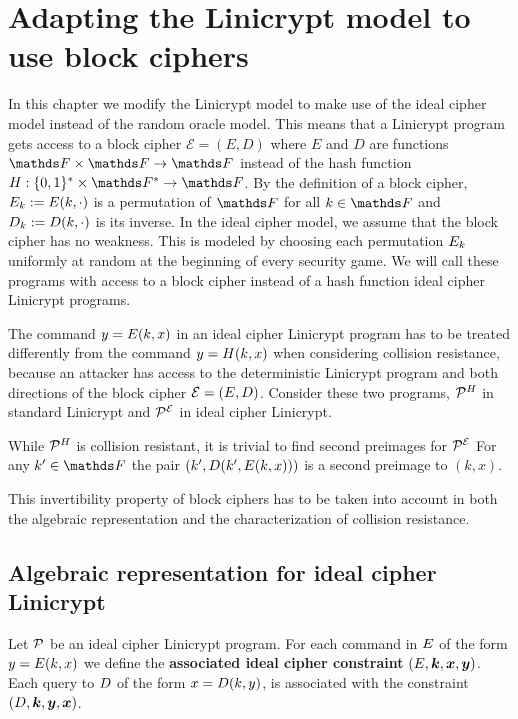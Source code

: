\section{Adapting the Linicrypt model to use block ciphers}

In this chapter we modify the Linicrypt model to make use of the ideal cipher model instead of the random oracle model.
This means that a Linicrypt program gets access to a block cipher $\mathcal{E} = (E, D)$ where $E$ and $D$ are functions $\F \times \F \to \F$
instead of the hash function $\H : \{0,1\}^* \times \F^* \to \F$.
By the definition of a block cipher,
$\E_k := \E(k, \cdot)$ is a permutation of $\F$ for all $k \in \F$ and
$\D_k := \D(k, \cdot)$ is its inverse.
In the ideal cipher model, we assume that the block cipher has no weakness.
This is modeled by choosing each permutation $\E_k$ uniformly at random at the beginning of every security game.
We will call these programs with access to a block cipher instead of a hash function ideal cipher Linicrypt programs.

The command $y = \E(k, x)$ in an ideal cipher Linicrypt program has to be treated differently from the command $y = \H(k, x)$ when considering collision resistance,
because an attacker has access to the deterministic Linicrypt program and both directions of the block cipher $\mathcal{E} = (\E, \D)$.
Consider these two programs, $\PH$ in standard Linicrypt and $\PE$ in ideal cipher Linicrypt.

\begin{pchstack}[center,space=2cm]
\end{pchstack}
While $\PH$ is collision resistant, it is trivial to find second preimages for $\PE$
For any $k' \in \F$ the pair $(k', \D(k', \E(k, x)))$ is a second preimage to $(k,x)$.

This invertibility property of block ciphers has to be taken into account
in both the algebraic representation and the characterization of collision resistance.

\subsection{Algebraic representation for ideal cipher Linicrypt}

Let $\P$ be an ideal cipher Linicrypt program.
For each command in $\E$ of the form $y = \E(k,x)$ we define the \textbf{associated ideal cipher constraint} $(\E, \v k, \v x, \v y)$.
Each query to $\D$ of the form $x = \D(k, y)$, is
associated with the constraint $(\D, \v k, \v y, \v x)$.

